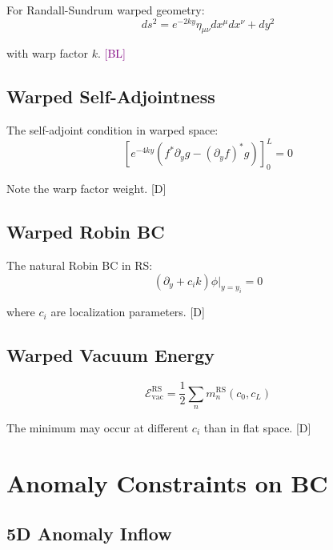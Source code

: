 \documentclass[11pt,a4paper]{article}
\newcommand{\tagD}{\textcolor{blue!70!black}{[D]}}
\newcommand{\tagBL}{\textcolor{purple}{[BL]}}
\begin{document}
For Randall-Sundrum warped geometry:
\begin{equation}
\label{eq:rs-metric}
ds^2 = e^{-2ky} \eta_{\mu\nu} dx^\mu dx^\nu + dy^2
\end{equation}

with warp factor $k$. \tagBL

\subsection{Warped Self-Adjointness}

The self-adjoint condition in warped space:
\begin{equation}
\label{eq:warped-sa}
\left[ e^{-4ky} (f^* \partial_y g - (\partial_y f)^* g) \right]_0^L = 0
\end{equation}

Note the warp factor weight. \tagD

\subsection{Warped Robin BC}

The natural Robin BC in RS:
\begin{equation}
\label{eq:warped-robin}
(\partial_y + c_i k) \phi\big|_{y=y_i} = 0
\end{equation}

where $c_i$ are localization parameters. \tagD

\subsection{Warped Vacuum Energy}

\begin{equation}
\label{eq:warped-vac}
\mathcal{E}_{\text{vac}}^{\text{RS}} = \frac{1}{2} \sum_n m_n^{\text{RS}}(c_0, c_L)
\end{equation}

The minimum may occur at different $c_i$ than in flat space. \tagD

\section{Anomaly Constraints on BC}

\subsection{5D Anomaly Inflow}
\end{document}
